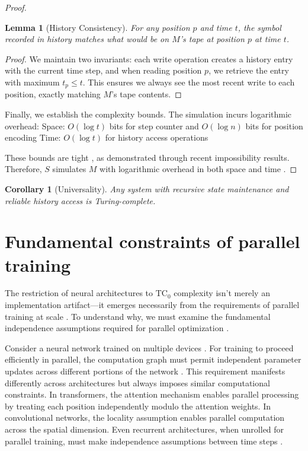 \documentclass[12pt]{article}
\newtheorem{lemma}[theorem]{Lemma}
\newtheorem{corollary}[theorem]{Corollary}
\begin{document}
\begin{proof}
\begin{lemma}[History Consistency]
For any position $p$ and time $t$, the symbol recorded in history matches what would be on $M$'s tape at position $p$ at time $t$.
\end{lemma}

\begin{proof}
We maintain two invariants: each write operation creates a history entry with the current time step, and when reading position $p$, we retrieve the entry with maximum $t_p \leq t$. This ensures we always see the most recent write to each position, exactly matching $M$'s tape contents.
\end{proof}

Finally, we establish the complexity bounds. The simulation incurs logarithmic overhead:
Space: $O(\log t)$ bits for step counter and $O(\log n)$ bits for position encoding
Time: $O(\log t)$ for history access operations

These bounds are tight \cite{parzych2024memory,hhan2024new,boyle2024memory}, as demonstrated through recent impossibility results. Therefore, $S$ simulates $M$ with logarithmic overhead in both space and time \cite{savage1994space,vonkorff2019molecular,bennett1989time}.
\end{proof}

\begin{corollary}[Universality]
Any system with recursive state maintenance and reliable history access is Turing-complete.
\end{corollary}

\section{Fundamental constraints of parallel training}

The restriction of neural architectures to $\text{TC}_0$ complexity isn't merely an implementation artifact---it emerges necessarily from the requirements of parallel training at scale \cite{merrill2023parallelism,peng2024limitations}. To understand why, we must examine the fundamental independence assumptions required for parallel optimization \cite{shallue2019measuring}.

Consider a neural network trained on multiple devices \cite{zhao2024epha}. For training to proceed efficiently in parallel, the computation graph must permit independent parameter updates across different portions of the network \cite{barrett2019analyzing}. This requirement manifests differently across architectures but always imposes similar computational constraints. In transformers, the attention mechanism enables parallel processing by treating each position independently modulo the attention weights. In convolutional networks, the locality assumption enables parallel computation across the spatial dimension. Even recurrent architectures, when unrolled for parallel training, must make independence assumptions between time steps \cite{dickson2023rnns}.
\end{document}
